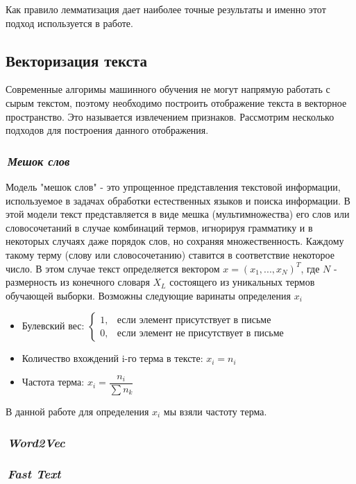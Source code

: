 \documentclass[12pt]{article}
\begin{document}
Как правило лемматизация дает наиболее точные результаты и именно этот подход используется в работе.

\subsection{Векторизация текста}
Современные алгоримы машинного обучения не могут напрямую работать с сырым текстом, поэтому необходимо построить отображение текста в векторное пространство. Это называется извлечением признаков. Рассмотрим несколько подходов для построения данного отображения.

\subsubsection*{\it\,Мешок слов}
Модель "мешок слов" - это упрощенное представления текстовой информации, используемое в задачах обработки естественных языков и поиска информации. В этой модели текст представляется в виде мешка (мультимножества) его слов или словосочетаний в случае комбинаций термов, игнорируя грамматику и в некоторых случаях даже порядок слов, но сохраняя множественность. Каждому такому терму (слову или словосочетанию) ставится в соответствие некоторое число. В этом случае текст определяется вектором $x=(x_1, ..., x_N)^T$, где $N$ - размерность из конечного словаря $X_L$ состоящего из уникальных термов обучающей выборки. Возможны следующие варинаты определения $x_i$
\begin{itemize}
\item Булевский вес: $\begin{cases} 1, & \mbox{если элемент присутствует в письме} \\ 0, & \mbox{если элемент не присутствует в письме}  \end{cases}$
\item Количество вхождений i-го терма в тексте: $x_i = n_i$
\item Частота терма: $x_i = \dfrac{n_i}{\sum n_k}$
\end{itemize}

В данной работе для определения $x_i$ мы взяли частоту терма.

\subsubsection*{\it\,Word2Vec}

\subsubsection*{\it\,Fast Text}
\end{document}
